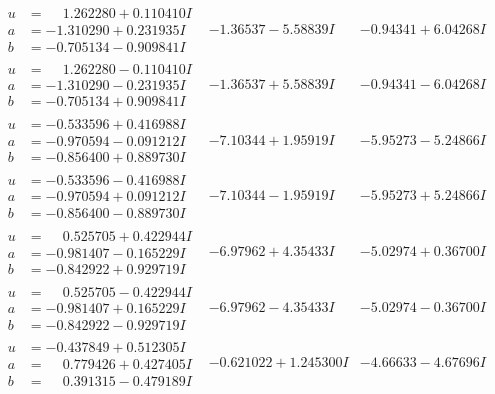 \documentclass[1p]{elsarticle_modified}
\theoremstyle{definition}
\begin{document}
$$\begin{array}{c|c|c}
\begin{aligned}
u &= \phantom{-}1.262280 + 0.110410 I \\
a &= -1.310290 + 0.231935 I \\
b &= -0.705134 - 0.909841 I\end{aligned}
 & -1.36537 - 5.58839 I & -0.94341 + 6.04268 I \\ \hline\begin{aligned}
u &= \phantom{-}1.262280 - 0.110410 I \\
a &= -1.310290 - 0.231935 I \\
b &= -0.705134 + 0.909841 I\end{aligned}
 & -1.36537 + 5.58839 I & -0.94341 - 6.04268 I \\ \hline\begin{aligned}
u &= -0.533596 + 0.416988 I \\
a &= -0.970594 - 0.091212 I \\
b &= -0.856400 + 0.889730 I\end{aligned}
 & -7.10344 + 1.95919 I & -5.95273 - 5.24866 I \\ \hline\begin{aligned}
u &= -0.533596 - 0.416988 I \\
a &= -0.970594 + 0.091212 I \\
b &= -0.856400 - 0.889730 I\end{aligned}
 & -7.10344 - 1.95919 I & -5.95273 + 5.24866 I \\ \hline\begin{aligned}
u &= \phantom{-}0.525705 + 0.422944 I \\
a &= -0.981407 - 0.165229 I \\
b &= -0.842922 + 0.929719 I\end{aligned}
 & -6.97962 + 4.35433 I & -5.02974 + 0.36700 I \\ \hline\begin{aligned}
u &= \phantom{-}0.525705 - 0.422944 I \\
a &= -0.981407 + 0.165229 I \\
b &= -0.842922 - 0.929719 I\end{aligned}
 & -6.97962 - 4.35433 I & -5.02974 - 0.36700 I \\ \hline\begin{aligned}
u &= -0.437849 + 0.512305 I \\
a &= \phantom{-}0.779426 + 0.427405 I \\
b &= \phantom{-}0.391315 - 0.479189 I\end{aligned}
 & -0.621022 + 1.245300 I & -4.66633 - 4.67696 I \\ \hline\begin{aligned}

\end{aligned}
\end{array}$$
\end{document}
